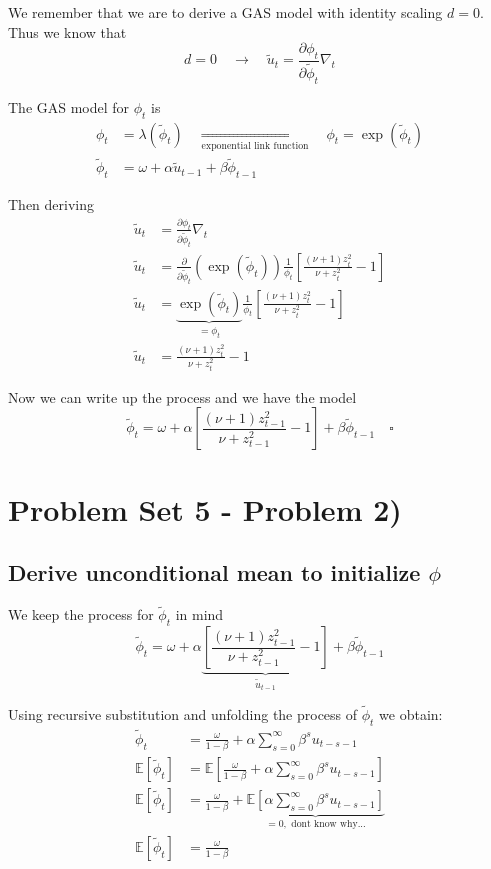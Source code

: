 \documentclass{article}
\begin{document}
We remember that we are to derive a GAS model with identity scaling
$d=0$. Thus we know that
\[
d=0\quad\rightarrow\quad\widetilde{u}_{t}=\frac{\partial\phi_{t}}{\partial\widetilde{\phi}_{t}}\nabla_{t}
\]

The GAS model for $\phi_{t}$ is
\begin{align*}
\phi_{t} & =\lambda\left(\widetilde{\phi}_{t}\right)\quad\underset{\text{exponential link function}}{\Longrightarrow}\quad\phi_{t}=\exp\left(\widetilde{\phi}_{t}\right)\\
\widetilde{\phi}_{t} & =\omega+\alpha\widetilde{u}_{t-1}+\beta\widetilde{\phi}_{t-1}
\end{align*}

Then deriving
\begin{align*}
\widetilde{u}_{t} & =\frac{\partial\phi_{t}}{\partial\widetilde{\phi}_{t}}\nabla_{t}\\
\widetilde{u}_{t} & =\frac{\partial}{\partial\widetilde{\phi}_{t}}\left(\exp\left(\widetilde{\phi}_{t}\right)\right)\frac{1}{\phi_{t}}\left[\frac{\left(\nu+1\right)z_{t}^{2}}{\nu+z_{t}^{2}}-1\right]\\
\widetilde{u}_{t} & =\underbrace{\exp\left(\widetilde{\phi}_{t}\right)}_{=\phi_{t}}\frac{1}{\phi_{t}}\left[\frac{\left(\nu+1\right)z_{t}^{2}}{\nu+z_{t}^{2}}-1\right]\\
\widetilde{u}_{t} & =\frac{\left(\nu+1\right)z_{t}^{2}}{\nu+z_{t}^{2}}-1
\end{align*}

Now we can write up the process and we have the model
\[
\widetilde{\phi}_{t}=\omega+\alpha\left[\frac{\left(\nu+1\right)z_{t-1}^{2}}{\nu+z_{t-1}^{2}}-1\right]+\beta\widetilde{\phi}_{t-1}\quad\square
\]


\section{Problem Set 5 - Problem 2)}

\subsection{Derive unconditional mean to initialize $\phi$}

We keep the process for $\widetilde{\phi}_{t}$ in mind
\[
\widetilde{\phi}_{t}=\omega+\alpha\underbrace{\left[\frac{\left(\nu+1\right)z_{t-1}^{2}}{\nu+z_{t-1}^{2}}-1\right]}_{\tilde{u}_{t-1}}+\beta\widetilde{\phi}_{t-1}
\]

Using recursive substitution and unfolding the process of $\widetilde{\phi}_{t}$
we obtain: 
\begin{align*}
\widetilde{\phi}_{t} & =\frac{\omega}{1-\beta}+\alpha\sum_{s=0}^{\infty}\beta^{s}u_{t-s-1}\\
\mathbb{E}\left[\widetilde{\phi}_{t}\right] & =\mathbb{E}\left[\frac{\omega}{1-\beta}+\alpha\sum_{s=0}^{\infty}\beta^{s}u_{t-s-1}\right]\\
\mathbb{E}\left[\widetilde{\phi}_{t}\right] & =\frac{\omega}{1-\beta}+\underbrace{\mathbb{E}\left[\alpha\sum_{s=0}^{\infty}\beta^{s}u_{t-s-1}\right]}_{=0,\text{ dont know why...}}\\
\mathbb{E}\left[\widetilde{\phi}_{t}\right] & =\frac{\omega}{1-\beta}
\end{align*}
\end{document}
